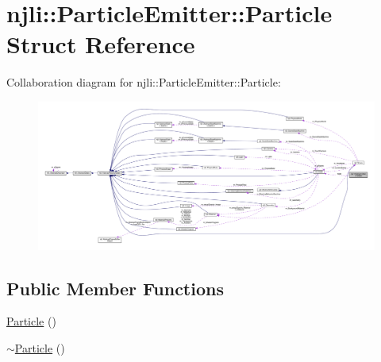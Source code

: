 \hypertarget{structnjli_1_1_particle_emitter_1_1_particle}{}\section{njli\+:\+:Particle\+Emitter\+:\+:Particle Struct Reference}
\label{structnjli_1_1_particle_emitter_1_1_particle}


Collaboration diagram for njli\+:\+:Particle\+Emitter\+:\+:Particle\+:\nopagebreak
\begin{figure}[H]
\begin{center}
\leavevmode
\includegraphics[width=350pt]{structnjli_1_1_particle_emitter_1_1_particle__coll__graph}
\end{center}
\end{figure}
\subsection*{Public Member Functions}
\begin{DoxyCompactItemize}
\item 
\mbox{\hyperlink{structnjli_1_1_particle_emitter_1_1_particle_a8c71e163c93619d9dcfdc4314147c3df}{Particle}} ()
\item 
\mbox{\hyperlink{structnjli_1_1_particle_emitter_1_1_particle_ab6cd7e2320832f8eae9de75bc1d9b05e}{$\sim$\+Particle}} ()
\end{DoxyCompactItemize}

